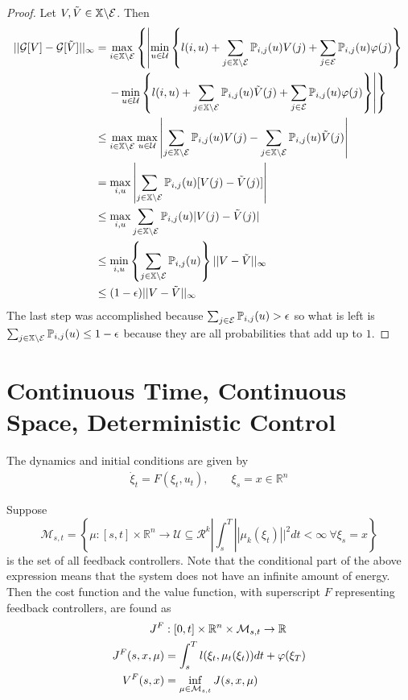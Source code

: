 \begin{proof}
Let $V,\tilde{V}\in\mathbb{X}\backslash\mathcal{E}$. Then
\begin{align*}
||\mathcal{G}[V]-\mathcal{G}[\tilde{V}]||_\infty &= \max_{i\in\mathbb{X}\backslash\mathcal{E}}\left\lbrace \left| \min_{u\in\mathcal{U}}\left\lbrace l(i,u) + \sum_{j\in\mathbb{X}\backslash\mathcal{E}}\mathbb{P}_{i,j}(u)V(j) + \sum_{j\in\mathcal{E}}\mathbb{P}_{i,j}(u)\varphi(j)\right\rbrace \right.\right. \\
&\left.\left.\quad - \min_{u\in\mathcal{U}}\left\lbrace l(i,u) + \sum_{j\in\mathbb{X}\backslash\mathcal{E}}\mathbb{P}_{i,j}(u)\tilde{V}(j) + \sum_{j\in\mathcal{E}}\mathbb{P}_{i,j}(u)\varphi(j) \right\rbrace\right|\right\rbrace \\
&\leq \max_{i\in\mathbb{X}\backslash\mathcal{E}} \max_{u\in\mathcal{U}} \left|\sum_{j\in\mathbb{X}\backslash\mathcal{E}}\mathbb{P}_{i,j}(u)V(j) - \sum_{j\in\mathbb{X}\backslash\mathcal{E}}\mathbb{P}_{i,j}(u)\tilde{V}(j)\right| \\
&= \max_{i,u} \left| \sum_{j\in\mathbb{X}\backslash\mathcal{E}}\mathbb{P}_{i,j}(u)[V(j)-\tilde{V}(j)]\right| \\
&\leq \max_{i,u} \sum_{j\in\mathbb{X}\backslash\mathcal{E}}\mathbb{P}_{i,j}(u)|V(j)-\tilde{V}(j)| \\
&\leq \min_{i,u} \left\lbrace \sum_{j\in\mathbb{X}\backslash\mathcal{E}}\mathbb{P}_{i,j}(u)\right\rbrace ||V-\tilde{V}||_\infty \\
&\leq (1-\epsilon)||V-\tilde{V}||_\infty
\end{align*}
The last step was accomplished because $\sum_{j\in\mathcal{E}}\mathbb{P}_{i,j}(u)>\epsilon$ so what is left is $\sum_{j\in\mathbb{X}\backslash\mathcal{E}}\mathbb{P}_{i,j}(u)\leq1-\epsilon$ because they are all probabilities that add up to $1$.
\end{proof}

\section{Continuous Time, Continuous Space, Deterministic Control}
The dynamics and initial conditions are given by
\begin{align}
\label{eq:ctcsdynamics}
\dot{\xi}_t = F(\xi_t,u_t), \qquad \xi_s=x\in\mathbb{R}^n
\end{align}

Suppose
$$\mathcal{M}_{s,t} = \left\lbrace\mu:[s,t]\times\mathbb{R}^n\to\mathcal{U}\subseteq\mathcal{R}^k | \int_s^T||\mu_k(\xi_t)||^2dt<\infty ~\forall \xi_s=x\right\rbrace$$
is the set of all feedback controllers. Note that the conditional part of the above expression means that the system does not have an infinite amount of energy. Then the cost function and the value function, with superscript $F$ representing feedback controllers, are found as
\begin{align*}
J^F&:[0,t]\times\mathbb{R}^n\times\mathcal{M}_{s,t}\to\mathbb{R} \\
J^F(s,x,\mu) &= \int_s^T l(\xi_t,\mu_t(\xi_t))dt + \varphi(\xi_T) \\
V^F(s,x) &= \inf_{\mu\in\mathcal{M}_{s,t}} J(s,x,\mu)
\end{align*}


